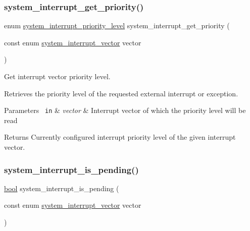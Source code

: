\subsubsection{\texorpdfstring{system\_interrupt\_get\_priority()}{system\_interrupt\_get\_priority()}}
{\footnotesize\ttfamily enum \mbox{\hyperlink{group__asfdoc__sam0__system__interrupt__group_ga6d21907577ff204de7f5fa4642c84589}{system\+\_\+interrupt\+\_\+priority\+\_\+level}} system\+\_\+interrupt\+\_\+get\+\_\+priority (\begin{DoxyParamCaption}\item[{const enum \mbox{\hyperlink{group__asfdoc__sam0__system__interrupt__group_ga43378e6222cc05290c1a0c6a9ba125cf}{system\+\_\+interrupt\+\_\+vector}}}]{vector }\end{DoxyParamCaption})}



Get interrupt vector priority level. 

Retrieves the priority level of the requested external interrupt or exception.


\begin{DoxyParams}[1]{Parameters}
\mbox{\texttt{ in}}  & {\em vector} & Interrupt vector of which the priority level will be read\\
\hline
\end{DoxyParams}
\begin{DoxyReturn}{Returns}
Currently configured interrupt priority level of the given interrupt vector. 
\end{DoxyReturn}
\mbox{\label{group__asfdoc__sam0__system__interrupt__group_ga08ea1ee1c7020c64e18a1673ca8548a4}} 
\subsubsection{\texorpdfstring{system\_interrupt\_is\_pending()}{system\_interrupt\_is\_pending()}}
{\footnotesize\ttfamily \mbox{\hyperlink{group__group__sam0__utils_ga97a80ca1602ebf2303258971a2c938e2}{bool}} system\+\_\+interrupt\+\_\+is\+\_\+pending (\begin{DoxyParamCaption}\item[{const enum \mbox{\hyperlink{group__asfdoc__sam0__system__interrupt__group_ga43378e6222cc05290c1a0c6a9ba125cf}{system\+\_\+interrupt\+\_\+vector}}}]{vector }\end{DoxyParamCaption})}



